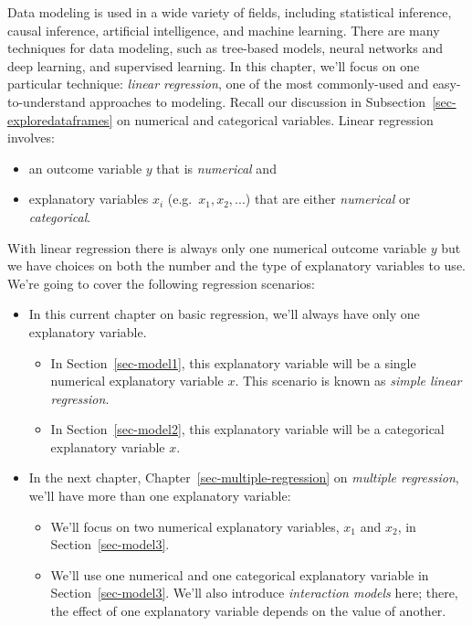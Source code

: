 \documentclass[
  letterpaper,
  DIV=11,
  numbers=noendperiod]{scrreprt}
\providecommand{\tightlist}{%
  \setlength{\itemsep}{0pt}\setlength{\parskip}{0pt}}\usepackage{longtable,booktabs,array}
\theoremstyle{definition}
\theoremstyle{remark}
\begin{document}
Data modeling is used in a wide variety of fields, including statistical
inference, causal inference, artificial intelligence, and machine
learning. There are many techniques for data modeling, such as
tree-based models, neural networks and deep learning, and supervised
learning. In this chapter, we'll focus on one particular technique:
\emph{linear regression}, one of the most commonly-used and
easy-to-understand approaches to modeling. Recall our discussion in
Subsection~\ref{sec-exploredataframes} on numerical and categorical
variables. Linear regression involves:

\begin{itemize}
\tightlist
\item
  an outcome variable \(y\) that is \emph{numerical} and
\item
  explanatory variables \(x_i\) (e.g.~\(x_1, x_2, ...\)) that are either
  \emph{numerical} or \emph{categorical}.
\end{itemize}

With linear regression there is always only one numerical outcome
variable \(y\) but we have choices on both the number and the type of
explanatory variables to use. We're going to cover the following
regression scenarios:

\begin{itemize}
\tightlist
\item
  In this current chapter on basic regression, we'll always have only
  one explanatory variable.

  \begin{itemize}
  \tightlist
  \item
    In Section~\ref{sec-model1}, this explanatory variable will be a
    single numerical explanatory variable \(x\). This scenario is known
    as \emph{simple linear regression}.
  \item
    In Section~\ref{sec-model2}, this explanatory variable will be a
    categorical explanatory variable \(x\).
  \end{itemize}
\item
  In the next chapter, Chapter~\ref{sec-multiple-regression} on
  \emph{multiple regression}, we'll have more than one explanatory
  variable:

  \begin{itemize}
  \tightlist
  \item
    We'll focus on two numerical explanatory variables, \(x_1\) and
    \(x_2\), in Section~\ref{sec-model3}.
  \item
    We'll use one numerical and one categorical explanatory variable in
    Section~\ref{sec-model3}. We'll also introduce \emph{interaction
    models} here; there, the effect of one explanatory variable depends
    on the value of another.
  \end{itemize}
\end{itemize}
\end{document}
